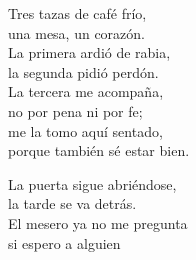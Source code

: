 \begin{lyrics}
Tres tazas de café frío,\\
una mesa, un corazón.\\
La primera ardió de rabia,\\
la segunda pidió perdón.\\
La tercera me acompaña,\\
no por pena ni por fe;\\
me la tomo aquí sentado,\\
porque también sé estar bien.

La puerta sigue abriéndose,\\
la tarde se va detrás.\\
El mesero ya no me pregunta\\
si espero a alguien
\end{lyrics}

